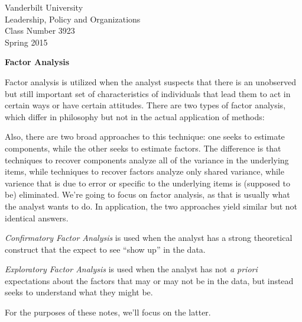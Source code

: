 \documentclass[12pt]{article}
\begin{document}
\thispagestyle{empty}%


\setlength{\parskip}{1ex plus 0.5ex minus 0.2ex}

\setcounter{secnumdepth}{-2}



\begin{flushleft}
Vanderbilt University\\Leadership, Policy and Organizations\\Class Number 3923\\ Spring 2015\\
\end{flushleft}

\begin{center}
\textbf{Factor Analysis}
\end{center}


Factor analysis is utilized when the analyst suspects  that there is
an unobserved but still important set of characteristics of
individuals that lead them to act in certain ways or have certain
attitudes. There are two types of factor analysis, which differ in
philosophy but not in the actual application of methods:

Also, there are two broad approaches to this technique: one seeks to
estimate components, while the other seeks to estimate factors. The
difference is that techniques to recover components analyze all of the
variance in the underlying items, while techniques to recover factors
analyze only shared variance, while varience that is due to error or
specific to the underlying items is (supposed to be) eliminated. We're
going to focus on factor analysis, as that is usually what the analyst
wants to do. In application, the two approaches yield similar but not
identical answers. 

\begin{description}

\item \emph{Confirmatory Factor Analysis} is used when the analyst
  has a strong theoretical construct that the expect to see ``show
  up'' in the data. 

\item \emph{Exploratory Factor Analysis} is used when the analyst has
  not \emph{a priori} expectations about the factors that may or may
  not be in the data, but instead seeks to understand what they might be.
\end{description}

For the purposes of these notes, we'll focus on the latter. 
\end{document}
